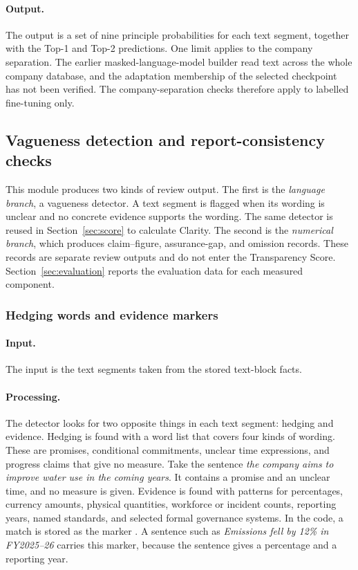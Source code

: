 \paragraph{Output.} The output is a set of nine principle probabilities for each text segment, together with the Top-1 and Top-2 predictions. One limit applies to the company separation. The earlier masked-language-model builder read text across the whole company database, and the adaptation membership of the selected checkpoint has not been verified. The company-separation checks therefore apply to labelled fine-tuning only.

\subsection{Vagueness detection and report-consistency checks}
\label{sec:detector}

This module produces two kinds of review output. The first is the \emph{language branch}, a vagueness detector. A text segment is flagged when its wording is unclear and no concrete evidence supports the wording. The same detector is reused in Section~\ref{sec:score} to calculate Clarity. The second is the \emph{numerical branch}, which produces claim--figure, assurance-gap, and omission records. These records are separate review outputs and do not enter the Transparency Score. Section~\ref{sec:evaluation} reports the evaluation data for each measured component.

\subsubsection{Hedging words and evidence markers}

\paragraph{Input.} The input is the text segments taken from the stored text-block facts.

\paragraph{Processing.} The detector looks for two opposite things in each text segment: hedging and evidence. Hedging is found with a word list that covers four kinds of wording. These are promises, conditional commitments, unclear time expressions, and progress claims that give no measure. Take the sentence \emph{the company aims to improve water use in the coming years}. It contains a promise and an unclear time, and no measure is given. Evidence is found with patterns for percentages, currency amounts, physical quantities, workforce or incident counts, reporting years, named standards, and selected formal governance systems. In the code, a match is stored as the marker . A sentence such as \emph{Emissions fell by 12\% in FY2025--26} carries this marker, because the sentence gives a percentage and a reporting year.

